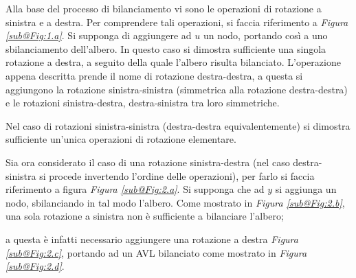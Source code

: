 \documentclass{subfiles}
\begin{document}
Alla base del processo di bilanciamento vi sono le operazioni di rotazione a sinistra e a destra.
Per comprendere tali operazioni, si faccia riferimento a \emph{Figura \ref{sub@Fig:1.a}}.
Si supponga di aggiungere ad \(u\) un nodo, portando così a uno sbilanciamento dell'albero.
In questo caso si dimostra sufficiente una singola rotazione a destra, a seguito della quale l'albero risulta bilanciato.
L'operazione appena descritta prende il nome di rotazione destra-destra,
a questa si aggiungono la rotazione sinistra-sinistra (simmetrica alla rotazione destra-destra) e le rotazioni sinistra-destra, destra-sinistra tra loro simmetriche.


\begin{Remark*}
    Nel caso di rotazioni sinistra-sinistra (destra-destra equivalentemente) si dimostra sufficiente un'unica operazioni di rotazione elementare.
\end{Remark*}

Sia ora considerato il caso di una rotazione sinistra-destra (nel caso destra-sinistra si procede invertendo l'ordine delle operazioni),
per farlo si faccia riferimento a figura \emph{Figura \ref{sub@Fig:2.a}}.
Si supponga che ad \(y\) si aggiunga un nodo, sbilanciando in tal modo l'albero.
Come mostrato in \emph{Figura \ref{sub@Fig:2.b}}, una sola rotazione a sinistra non è sufficiente a bilanciare l'albero;

a questa è infatti necessario aggiungere una rotazione a destra \emph{Figura \ref{sub@Fig:2.c}},
portando ad un AVL bilanciato come mostrato in \emph{Figura \ref{sub@Fig:2.d}}.
\end{document}
